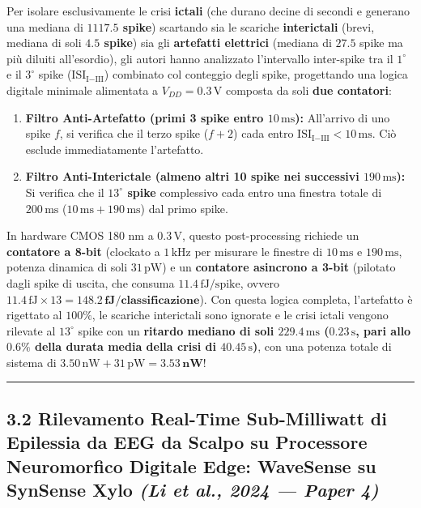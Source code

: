 \documentclass[11pt,a4paper]{article}
\begin{document}
Per isolare esclusivamente le crisi \textbf{ictali} (che durano decine di secondi e generano una mediana di \textbf{$1117.5$ spike}) scartando sia le scariche \textbf{interictali} (brevi, mediana di soli \textbf{$4.5$ spike}) sia gli \textbf{artefatti elettrici} (mediana di $27.5$ spike ma più diluiti all'esordio), gli autori hanno analizzato l'intervallo inter-spike tra il $1^\circ$ e il $3^\circ$ spike ($\text{ISI}_{\text{I}-\text{III}}$) combinato col conteggio degli spike, progettando una logica digitale minimale alimentata a $V_{DD} = 0.3\,\text{V}$ composta da soli \textbf{due contatori}:
\begin{enumerate}
  \item \textbf{Filtro Anti-Artefatto (primi 3 spike entro $10\,\text{ms}$):} All'arrivo di uno spike $f$, si verifica che il terzo spike ($f+2$) cada entro \textbf{$\text{ISI}_{\text{I}-\text{III}} < 10\,\text{ms}$}. Ciò esclude immediatamente l'artefatto.
  \item \textbf{Filtro Anti-Interictale (almeno altri 10 spike nei successivi $190\,\text{ms}$):} Si verifica che il \textbf{$13^\circ$ spike} complessivo cada entro una finestra totale di \textbf{$200\,\text{ms}$} ($10\,\text{ms} + 190\,\text{ms}$) dal primo spike.
\end{enumerate}

In hardware CMOS 180 nm a $0.3\,\text{V}$, questo post-processing richiede un \textbf{contatore a 8-bit} (clockato a $1\,\text{kHz}$ per misurare le finestre di $10\,\text{ms}$ e $190\,\text{ms}$, potenza dinamica di soli \textbf{$31\,\text{pW}$}) e un \textbf{contatore asincrono a 3-bit} (pilotato dagli spike di uscita, che consuma \textbf{$11.4\,\text{fJ/spike}$}, ovvero $11.4\,\text{fJ} \times 13 = \mathbf{148.2\,\text{fJ/classificazione}}$). Con questa logica completa, l'artefatto è rigettato al $100\%$, le scariche interictali sono ignorate e le crisi ictali vengono rilevate al $13^\circ$ spike con un \textbf{ritardo mediano di soli $229.4\,\text{ms}$ ($0.23\,\text{s}$, pari allo $0.6\%$ della durata media della crisi di $40.45\,\text{s}$)}, con una potenza totale di sistema di \textbf{$3.50\,\text{nW} + 31\,\text{pW} = \mathbf{3.53\,\text{nW}}$}!

\bigskip\hrule\bigskip

\subsection{3.2 Rilevamento Real-Time Sub-Milliwatt di Epilessia da EEG da Scalpo su Processore Neuromorfico Digitale Edge: WaveSense su SynSense Xylo \textit{(Li et al., 2024 --- Paper 4)}}
\end{document}

